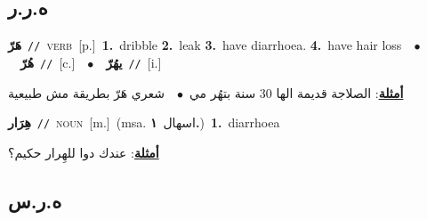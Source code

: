 \documentclass[10pt,a4paper,twoside]{article} %
\begin{document}
\begin{multicols}{2}
\vspace{-3mm}
\subsection*{\color{blue}\foreignlanguage{arabic}{ه.ر.ر}\color{blue}{}} 

{\setlength\topsep{0pt}\textbf{\foreignlanguage{arabic}{هَرّ}}\ {\color{gray}\texttt{//}\color{black}}\ \textsc{verb}\ [p.]\ \textbf{1.}~dribble  \textbf{2.}~leak  \textbf{3.}~have diarrhoea.  \textbf{4.}~have hair loss\ \ $\bullet$\ \ \setlength\topsep{0pt}\textbf{\foreignlanguage{arabic}{هُرّ}}\ {\color{gray}\texttt{//}\color{black}}\ [c.]\ \ $\bullet$\ \ \setlength\topsep{0pt}\textbf{\foreignlanguage{arabic}{يهُرّ}}\ {\color{gray}\texttt{//}\color{black}}\ [i.]\  \begin{flushright}\color{gray}\foreignlanguage{arabic}{\textbf{\underline{\foreignlanguage{arabic}{أمثلة}}}: الصلاجة قديمة الها 30 سنة بتهُر مي\ $\bullet$\ \  شعري هَرّ بطريقة مش طبيعية}\end{flushright}\color{black}} \vspace{2mm}

{\setlength\topsep{0pt}\textbf{\foreignlanguage{arabic}{هِرَار}}\ {\color{gray}\texttt{//}\color{black}}\ \textsc{noun}\ [m.]\ \color{gray}(msa. \foreignlanguage{arabic}{اسهال}~\foreignlanguage{arabic}{\textbf{١.}})\color{black}\ \textbf{1.}~diarrhoea\  \begin{flushright}\color{gray}\foreignlanguage{arabic}{\textbf{\underline{\foreignlanguage{arabic}{أمثلة}}}: عندك دوا للهِرار حكيم؟}\end{flushright}\color{black}} \vspace{2mm}

\vspace{-3mm}
\subsection*{\color{blue}\foreignlanguage{arabic}{ه.ر.س}\color{blue}{}} 


\end{multicols}
\end{document}
